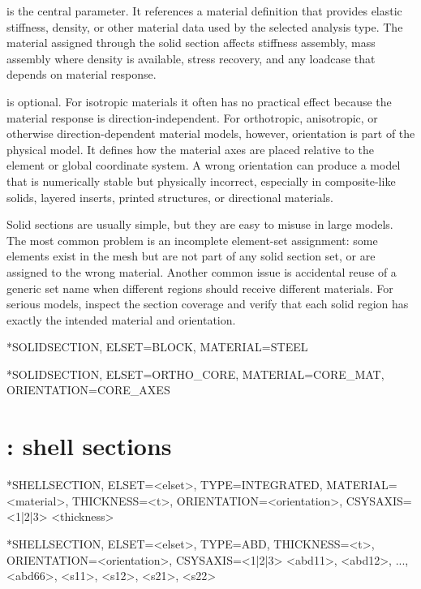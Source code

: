  is the central parameter. It references a material definition that provides elastic stiffness, density, or other material data used by the selected analysis type. The material assigned through the solid section affects stiffness assembly, mass assembly where density is available, stress recovery, and any loadcase that depends on material response.

 is optional. For isotropic materials it often has no practical effect because the material response is direction-independent. For orthotropic, anisotropic, or otherwise direction-dependent material models, however, orientation is part of the physical model. It defines how the material axes are placed relative to the element or global coordinate system. A wrong orientation can produce a model that is numerically stable but physically incorrect, especially in composite-like solids, layered inserts, printed structures, or directional materials.

Solid sections are usually simple, but they are easy to misuse in large models. The most common problem is an incomplete element-set assignment: some elements exist in the mesh but are not part of any solid section set, or are assigned to the wrong material. Another common issue is accidental reuse of a generic set name when different regions should receive different materials. For serious models, inspect the section coverage and verify that each solid region has exactly the intended material and orientation.

\begin{exampledeck}
*SOLIDSECTION, ELSET=BLOCK, MATERIAL=STEEL
\end{exampledeck}

\begin{exampledeck}
*SOLIDSECTION, ELSET=ORTHO_CORE, MATERIAL=CORE_MAT, ORIENTATION=CORE_AXES
\end{exampledeck}

\clearpage

\section{: shell sections}

\begin{syntax}
*SHELLSECTION, ELSET=<elset>, TYPE=INTEGRATED, MATERIAL=<material>, THICKNESS=<t>, ORIENTATION=<orientation>, CSYSAXIS=<1|2|3>
<thickness>

*SHELLSECTION, ELSET=<elset>, TYPE=ABD, THICKNESS=<t>, ORIENTATION=<orientation>, CSYSAXIS=<1|2|3>
<abd11>, <abd12>, ..., <abd66>, <s11>, <s12>, <s21>, <s22>
\end{syntax}

